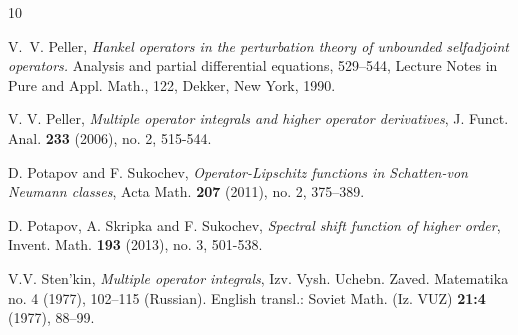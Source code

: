\documentclass[12pt]{amsart}
\theoremstyle{remark}
\begin{document}
\begin{thebibliography}{10}

V.~V. Peller, \emph{Hankel operators in the perturbation theory of unbounded selfadjoint operators.} Analysis and partial differential equations, 529--544, Lecture Notes in Pure and Appl. Math., 122, Dekker, New York, 1990.




V. V. Peller, {\it Multiple operator integrals and higher
operator derivatives}, J. Funct. Anal. \textbf{233} (2006), no. 2,
515-544.


D. Potapov and F. Sukochev, {\it Operator-Lipschitz functions
in Schatten-von Neumann classes},  Acta Math. \textbf{207}
(2011), no. 2, 375--389.



D. Potapov, A. Skripka and F. Sukochev, {\it Spectral shift
function of higher order},  Invent. Math. \textbf{193} (2013), no.
3, 501-538.



 V.V. Sten’kin, \textit{Multiple operator integrals}, Izv. Vysh. Uchebn. Zaved. Matematika no. 4 (1977), 102–115 (Russian).
English transl.: Soviet Math. (Iz. VUZ) \textbf{21:4} (1977), 88–99.


\end{thebibliography}







\vskip 1cm
\end{document}
